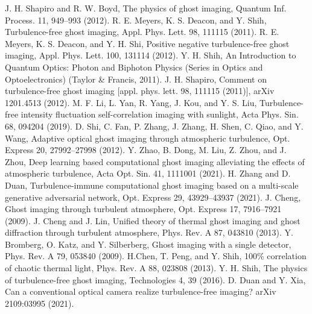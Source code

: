 \documentclass[letterpaper,10pt]{article}
\begin{document}
\begin{thebibliography}{99}
J. H. Shapiro and R. W. Boyd, The physics of ghost imaging, Quantum Inf. Process. 11, 949–993 (2012).
R. E. Meyers, K. S. Deacon, and Y. Shih, Turbulence-free ghost imaging, Appl. Phys. Lett. 98, 111115 (2011).
R. E. Meyers, K. S. Deacon, and Y. H. Shi, Positive negative turbulence-free ghost imaging, Appl. Phys. Lett. 100, 131114 (2012).
Y. H. Shih, An Introduction to Quantum Optics: Photon and Biphoton Physics (Series in Optics and Optoelectronics) (Taylor \& Francis, 2011).
J. H. Shapiro, Comment on turbulence-free ghost imaging [appl. phys. lett. 98, 111115 (2011)], arXiv 1201.4513 (2012).
M. F. Li, L. Yan, R. Yang, J. Kou, and Y. S. Liu, Turbulence-free intensity fluctuation self-correlation imaging with sunlight, Acta Phys. Sin. 68, 094204 (2019).
D. Shi, C. Fan, P. Zhang, J. Zhang, H. Shen, C. Qiao, and Y. Wang, Adaptive optical ghost imaging through atmospheric turbulence, Opt. Express 20, 27992–27998 (2012).
Y. Zhao, B. Dong, M. Liu, Z. Zhou, and J. Zhou, Deep learning based computational ghost imaging alleviating the effects of atmospheric turbulence, Acta Opt. Sin. 41, 1111001 (2021).
H. Zhang and D. Duan, Turbulence-immune computational ghost imaging based on a multi-scale generative adversarial network, Opt. Express 29, 43929–43937 (2021).
J. Cheng, Ghost imaging through turbulent atmosphere, Opt. Express 17, 7916–7921 (2009).
J. Cheng and J. Lin, Unified theory of thermal ghost imaging and ghost diffraction through turbulent atmosphere, Phys. Rev. A 87, 043810 (2013).
Y. Bromberg, O. Katz, and Y. Silberberg, Ghost imaging with a single detector, Phys. Rev. A 79, 053840 (2009).
H.Chen, T. Peng, and Y. Shih, 100\% correlation of chaotic thermal light, Phys. Rev. A 88, 023808 (2013).
Y. H. Shih, The physics of turbulence-free ghost imaging, Technologies 4, 39 (2016).
D. Duan and Y. Xia, Can a conventional optical camera realize turbulence-free imaging? arXiv 2109:03995 (2021).


\end{thebibliography}
\end{document}
